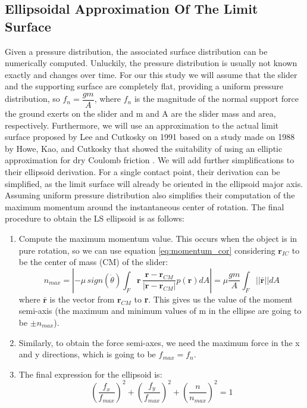 \documentclass[12,twoside]{TFG-GM}
\theoremstyle{definition}
\theoremstyle{remark}
\newcommand*\diff[1]{\bar{#1}}
\begin{document}
\subsection{Ellipsoidal Approximation Of The Limit Surface}
Given a pressure distribution, the associated surface distribution can be numerically computed. Unluckily, the pressure distribution is usually not known exactly and changes over time. For our this study we will assume that the slider and the supporting surface are completely flat, providing a uniform pressure distribution, so $f_n = \dfrac{g m}{A}$, where $f_n$ is the magnitude of the normal support force the ground exerts on the slider and m and A are the slider mass and area, respectively. Furthermore, we will use an approximation to the actual limit surface proposed by Lee and Cutkosky on 1991 \cite{ellipsoidal_ls} based on a study made on 1988 by Howe, Kao, and Cutkosky that showed the suitability of using an elliptic approximation for dry Coulomb friction \cite{elliptical_approx}. We will add further simplifications to their ellipsoid derivation. For a single contact point, their derivation can be simplified, as the limit surface will already be oriented in the ellipsoid major axis. Assuming uniform pressure distribution also simplifies their computation of the maximum momentum around the instantaneous center of rotation. The final procedure to obtain the LS ellipsoid is as follows:

\begin{enumerate}
\item Compute the maximum momentum value. This occurs when the object is in pure rotation, so we can use equation \ref{eq:momentum_cor} considering $\textbf{r}_{IC}$ to be the center of mass (CM) of the slider:
\begin{equation} \label{eq:max_momentum}
n_{max} =  \left| - \mu \, sign(\dot{\theta}) \int_F \textbf{r} \, \dfrac{\textbf{r} - \textbf{r}_{CM}}{|\textbf{r} - \textbf{r}_{CM}|} p(\textbf{r}) dA \right| = \mu \dfrac{g m}{A} \int_F ||\diff{\textbf{r}}|| dA
\end{equation}
where $\diff{\textbf{r}}$ is the vector from $\textbf{r}_{CM}$ to \textbf{r}. This gives us the value of the moment semi-axis (the maximum and minimum values of m in the ellipse are going to be $\pm n_{max}$).
\item Similarly, to obtain the force semi-axes, we need the maximum force in the x and y directions, which is going to be $f_{max} = f_n$.
\item The final expression for the ellipsoid is:
\begin{equation} \label{eq:max_momentum}
\left(\dfrac{f_x}{f_{max}}\right)^2 + \left(\dfrac{f_y}{f_{max}}\right)^2 + \left(\dfrac{n}{n_{max}}\right)^2 = 1
\end{equation}
\end{enumerate}
\end{document}
